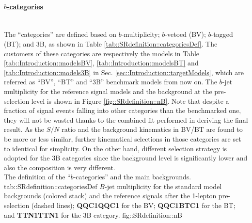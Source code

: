 \paragraph{\underline{\textbf{$b$-categories}}} \mbox{} \\
The ``categories'' are defined based on $b$-multiplicity; $b$-vetoed (BV); $b$-tagged (BT); and 3B, as shown in Table \ref{tab::SRdefinition::categoriesDef}. 
The customers of these categories are respectively the models in Table \ref{tab::Introduction::modelsBV}, \ref{tab::Introduction::modelsBT} and \ref{tab::Introduction::models3B} in Sec. \ref{sec::Introduction::targetModels}, which are referred as ``BV'', ``BT'' and ``3B'' benchmark models from now on. 
The $b$-jet multiplicity for the reference signal models and the background at the pre-selection level is shown in Figure \ref{fig::SRdefinition::nB}.
Note that despite a fraction of signal events falling into other categories than the benchmarked one, they will not be wasted thanks to the combined fit performed in deriving the final result.
As the $S/N$ ratio and the background kinematics in BV/BT are found to be more or less similar, further kinematical selections in those categories are set to identical for simplicity. 
On the other hand, different selection strategy is adopted for the 3B categories since the background level is significantly lower and also the composition is very different. \\

{The definition of the ``$b$-categories'' and the main backgrounds.}
{tab::SRdefinition::categoriesDef}
{$B$-jet multiplicity for the standard model backgrounds (colored stack) and the reference signals after the 1-lepton pre-selection (dashed lines); \textbf{QQC1QQC1} for the BV; \textbf{QQC1BTC1} for the BT; and \textbf{TTN1TTN1} for the 3B category.}
{fig::SRdefinition::nB}

\clearpage
